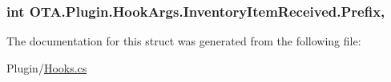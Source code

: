 \subsubsection[{Prefix}]{\setlength{\rightskip}{0pt plus 5cm}int O\+T\+A.\+Plugin.\+Hook\+Args.\+Inventory\+Item\+Received.\+Prefix\hspace{0.3cm}{\ttfamily [get]}, {\ttfamily [set]}}\label{struct_o_t_a_1_1_plugin_1_1_hook_args_1_1_inventory_item_received_ae266da8aa94f51a410ef91fa0dd8a5b8}


The documentation for this struct was generated from the following file\+:\begin{DoxyCompactItemize}
\item 
Plugin/\hyperlink{_hooks_8cs}{Hooks.\+cs}\end{DoxyCompactItemize}
